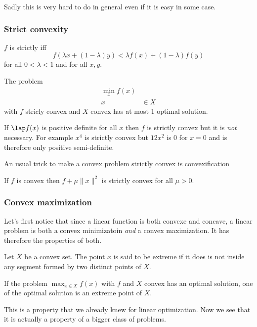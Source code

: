 Sadly this is very hard to do in general even if it is easy in some case.

\subsubsection{Strict convexity}
\begin{mydef}
  $f$ is strictly iff
  \[ f(\lambda x + (1-\lambda)y) < \lambda f(x) + (1-\lambda)f(y) \]
  for all $0 < \lambda < 1$ and for all $x,y$.
\end{mydef}

\begin{mytheo}
  The problem
  \begin{align*}
    \min_x f(x)\\
    x & \in X
  \end{align*}
  with $f$ stricly convex and $X$ convex has at most 1 optimal solution.
\end{mytheo}

If $\lap f(x)$ is positive definite for all $x$ then $f$ is strictly convex
but it is \emph{not} necessary.
For example $x^4$ is strictly convex but $12x^2$ is 0 for $x=0$ and
is therefore only positive semi-definite.

An usual trick to make a convex problem strictly convex is convexification
\begin{mytheo}[Regularization]
  If $f$ is convex then $f + \mu\|x\|^2$ is strictly convex for all $\mu > 0$.
\end{mytheo}

\subsubsection{Convex maximization}
Let's first notice that since a linear function is both convexe and concave,
a linear problem is both a convex minimizatoin \emph{and} a convex maximization.
It has therefore the properties of both.

\begin{mydef}
  Let $X$ be a convex set.
  The point $x$ is said to be extreme if it does is not inside any segment formed
  by two distinct points of $X$.
\end{mydef}

\begin{mytheo}
  If the problem $\max_{x \in X} f(x)$ with $f$ and $X$ convex has an optimal solution,
  one of the optimal solution is an extreme point of $X$.
\end{mytheo}
This is a property that we already knew for linear optimization.
Now we see that it is actually a property of a bigger class of problems.

